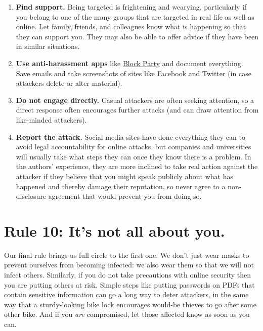 \documentclass[10pt,letterpaper]{article}
\begin{document}
\begin{enumerate}
\item
  \textbf{Find support.} Being targeted is frightening and wearying,
  particularly if you belong to one of the many groups that are targeted in real
  life as well as online. Let family, friends, and colleagues know what is
  happening so that they can support you. They may also be able to offer advice
  if they have been in similar situations.

\item
  \textbf{Use anti-harassment apps}
  like \href{https://www.blockpartyapp.com/}{{Block Party}} and document
  everything. Save emails and take screenshots of sites like Facebook and
  Twitter (in case attackers delete or alter material).

\item
  \textbf{Do not engage directly.} Casual attackers are often seeking attention,
  so a direct response often encourages further attacks (and can draw attention
  from like-minded attackers).

\item
  \textbf{Report the attack.} Social media sites have done everything they can
  to avoid legal accountability for online attacks, but companies and
  universities will usually take what steps they can once they know there is a
  problem. In the authors' experience, they are more inclined to take real
  action against the attacker if they believe that you might speak publicly
  about what has happened and thereby damage their reputation, so never agree to
  a non-disclosure agreement that would prevent you from doing so.
\end{enumerate}

\section*{Rule 10: It's not all about you.}

Our final rule brings us full circle to the first one. We don't just wear masks
to prevent ourselves from becoming infected: we also wear them so that we will
not infect others. Similarly, if you do not take precautions with online
security then you are putting others at risk.  Simple steps like putting
passwords on PDFs that contain sensitive information can go a long way to deter
attackers, in the same way that a sturdy-looking bike lock encourages would-be
thieves to go after some other bike. And if you \emph{are} compromised, let
those affected know as soon as you can.
\end{document}
